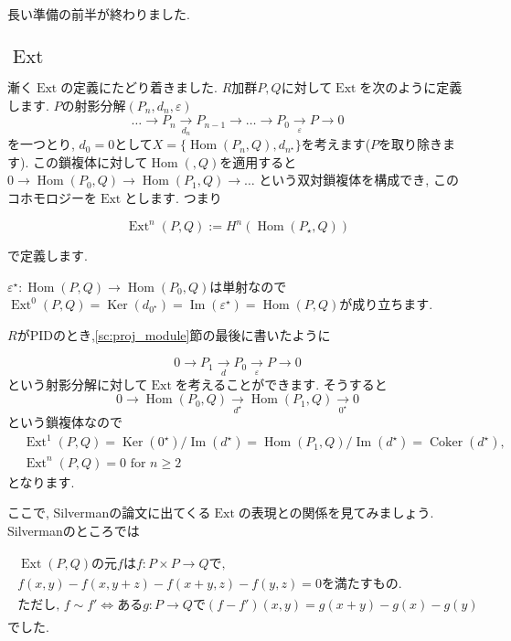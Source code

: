 \documentclass{jsarticle}
\newcommand{\makeop}[1]{\mathop{\mathrm{#1}}\nolimits}
\def\Im{\makeop{Im}}
\def\Ker{\makeop{Ker}}
\def\Hom{\makeop{Hom}}
\def\Ext{\makeop{Ext}}
\def\Coker{\makeop{Coker}}
\theoremstyle{definition}
\numberwithin{theorem}{section}
\begin{document}
長い準備の前半が終わりました.

\subsection{$\Ext$}
漸く$\Ext$の定義にたどり着きました.
$R$加群$P, Q$に対して$\Ext$を次のように定義します. $P$の射影分解$(P_n, d_n, \varepsilon)$
\[
\ldots \rightarrow P_n \xrightarrow[d_n]{} P_{n-1} \rightarrow \ldots \rightarrow P_0 \xrightarrow[\varepsilon]{} P \rightarrow 0
\]
を一つとり, $d_0 = 0$として$X = \{\Hom(P_n, Q), d_{n^\star}\}$を考えます($P$を取り除きます).
この鎖複体に対して$\Hom(, Q)$を適用すると$0\rightarrow \Hom(P_0, Q) \rightarrow \Hom(P_1, Q) \rightarrow \ldots$
という双対鎖複体を構成でき, このコホモロジーを$\Ext$とします. つまり

\begin{equation*}
\Ext^n(P, Q) := H^n(\Hom(P_\star, Q))
\end{equation*}

で定義します. 

$\varepsilon^\star: \Hom(P, Q) \rightarrow \Hom(P_0, Q)$は単射なので
$\Ext^0(P, Q) = \Ker(d_{0^\star}) = \Im(\varepsilon^\star) = \Hom(P, Q)$が成り立ちます.

$R$がPIDのとき,\ref{sc:proj_module}節の最後に書いたように

\[
0 \rightarrow P_1 \xrightarrow[d]{} P_0 \xrightarrow[\varepsilon]{} P \rightarrow 0
\]
という射影分解に対して$\Ext$を考えることができます. そうすると
\[
0 \rightarrow \Hom(P_0, Q) \xrightarrow[d^\star]{} \Hom(P_1, Q) \xrightarrow[0^\star]{} 0
\]
という鎖複体なので
\begin{align*}
& \Ext^1(P, Q) = \Ker(0^\star)/\Im(d^\star) = \Hom(P_1, Q)/\Im(d^\star) = \Coker(d^\star),\\
& \Ext^n(P, Q) = 0  \text{ for } n \geq 2
\end{align*}
となります. 

ここで, Silvermanの論文に出てくる$\Ext$の表現との関係を見てみましょう. Silvermanのところでは

\begin{eqnarray}
\label{eq:silverman_ext_def}
\begin{array}{l}
\Ext(P, Q)\mbox{の元}fはf: P\times P \rightarrow Qで, \\
f(x, y) - f(x, y+z) - f(x+y, z) - f(y, z) = 0\mbox{を満たすもの.}\\
\mbox{ただし, }f\sim f' \Leftrightarrow ある g:P\rightarrow Qで(f-f')(x, y) = g(x+y) - g(x) - g(y)
\end{array}
\end{eqnarray}
でした.
\end{document}
